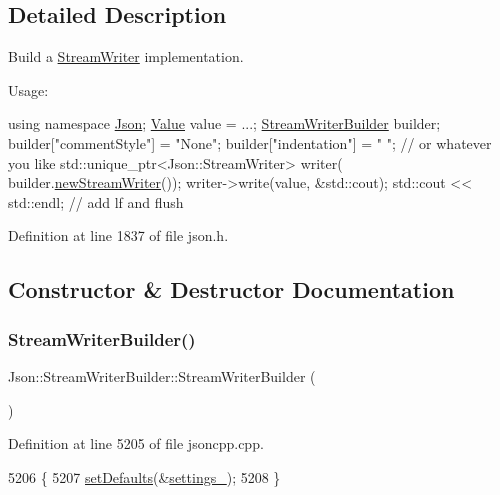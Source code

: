 \subsection{Detailed Description}
Build a \hyperlink{class_json_1_1_stream_writer}{Stream\+Writer} implementation. 

Usage\+: 
\begin{DoxyCode}
\textcolor{keyword}{using namespace }\hyperlink{namespace_json}{Json};
\hyperlink{class_json_1_1_value}{Value} value = ...;
\hyperlink{class_json_1_1_stream_writer_builder}{StreamWriterBuilder} builder;
builder[\textcolor{stringliteral}{"commentStyle"}] = \textcolor{stringliteral}{"None"};
builder[\textcolor{stringliteral}{"indentation"}] = \textcolor{stringliteral}{"   "};  \textcolor{comment}{// or whatever you like}
std::unique\_ptr<Json::StreamWriter> writer(
    builder.\hyperlink{class_json_1_1_stream_writer_builder_ab9ee278609f88ae04a7c1a84e1f559e6}{newStreamWriter}());
writer->write(value, &std::cout);
std::cout << std::endl;  \textcolor{comment}{// add lf and flush}
\end{DoxyCode}
 

Definition at line 1837 of file json.\+h.



\subsection{Constructor \& Destructor Documentation}
\mbox{\label{class_json_1_1_stream_writer_builder_ab95b76179c152673ad14abc639a46ee4}} 
\subsubsection{\texorpdfstring{Stream\+Writer\+Builder()}{StreamWriterBuilder()}}
{\footnotesize\ttfamily Json\+::\+Stream\+Writer\+Builder\+::\+Stream\+Writer\+Builder (\begin{DoxyParamCaption}{ }\end{DoxyParamCaption})}



Definition at line 5205 of file jsoncpp.\+cpp.


\begin{DoxyCode}
5206 \{
5207   \hyperlink{class_json_1_1_stream_writer_builder_a53bf106b141e28637b01ad0ecd2acbf6}{setDefaults}(&\hyperlink{class_json_1_1_stream_writer_builder_a79bdf2e639a52f4e758c0b95bd1d3423}{settings\_});
5208 \}
\end{DoxyCode}
\mbox{\label{class_json_1_1_stream_writer_builder_a93263f8ef1e2d22593907075d8f0aaef}} 
